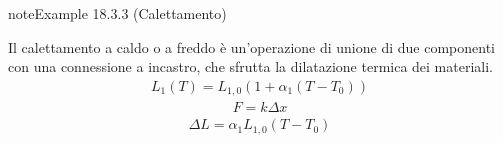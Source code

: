 \documentclass[letterpaper,10pt,italian]{jupyterBook}
\begin{document}
\begin{sphinxadmonition}{note}{Example 18.3.3 (Calettamento)}



\sphinxAtStartPar
Il calettamento a caldo o a freddo è un’operazione di unione di due componenti con una connessione a incastro, che sfrutta la dilatazione termica dei materiali.  
\begin{equation*}
\begin{split}L_1(T) = L_{1,0} (1 + \alpha_1 (T-T_0))\end{split}
\end{equation*}\begin{equation*}
\begin{split}F = k \Delta x\end{split}
\end{equation*}\begin{equation*}
\begin{split}\Delta L = \alpha_1 L_{1,0} ( T - T_0 )\end{split}
\end{equation*}\end{sphinxadmonition}

\sphinxstepscope
\end{document}
